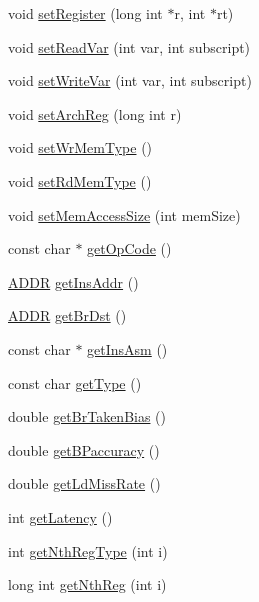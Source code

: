 \begin{DoxyCompactItemize}
\item 
void \hyperlink{classinstruction_a456de8aa26ff79d2b7cd203f7c59f2cb}{setRegister} (long int $\ast$r, int $\ast$rt)
\item 
void \hyperlink{classinstruction_a093ff19f17baaf84d4539ea395468265}{setReadVar} (int var, int subscript)
\item 
void \hyperlink{classinstruction_a67c584522eaa68d46a495170ce8a3bbd}{setWriteVar} (int var, int subscript)
\item 
void \hyperlink{classinstruction_a8e201444f39b8a779022284e280fdf23}{setArchReg} (long int r)
\item 
void \hyperlink{classinstruction_a1a85e010b731e20bcd25310a26eabd98}{setWrMemType} ()
\item 
void \hyperlink{classinstruction_a0d47af8822438b6e838c08dbd31cc02c}{setRdMemType} ()
\item 
void \hyperlink{classinstruction_ab36280a1a2cd3339e45c8271deaa23d0}{setMemAccessSize} (int memSize)
\item 
const char $\ast$ \hyperlink{classinstruction_a47d6ca18417d4f185495eb9be2844f07}{getOpCode} ()
\item 
\hyperlink{binaryTranslator_2global_8h_aa4557b0650cb21e57e3e4623410832c6}{ADDR} \hyperlink{classinstruction_ac1fabe854c85726785052c7a5ebf6d39}{getInsAddr} ()
\item 
\hyperlink{binaryTranslator_2global_8h_aa4557b0650cb21e57e3e4623410832c6}{ADDR} \hyperlink{classinstruction_ad9d2ab40d6cf65d68172316c37438497}{getBrDst} ()
\item 
const char $\ast$ \hyperlink{classinstruction_a9404c158382339e863846837c9b252aa}{getInsAsm} ()
\item 
const char \hyperlink{classinstruction_a47623362d505a662b974624f81288389}{getType} ()
\item 
double \hyperlink{classinstruction_ac2be260e8fce5e0615bd68bed97cb591}{getBrTakenBias} ()
\item 
double \hyperlink{classinstruction_a023333937041baf6bc2985c94f88c9e5}{getBPaccuracy} ()
\item 
double \hyperlink{classinstruction_a14d57791b666452fdb91973e35c39c2e}{getLdMissRate} ()
\item 
int \hyperlink{classinstruction_a842fd50e52a3e3d31fcf8b7a180a32bd}{getLatency} ()
\item 
int \hyperlink{classinstruction_a9701f53aafaf1b2298378665059cef33}{getNthRegType} (int i)
\item 
long int \hyperlink{classinstruction_a54412da0ee022e05101d4fb92ee879b9}{getNthReg} (int i)

\end{DoxyCompactItemize}
